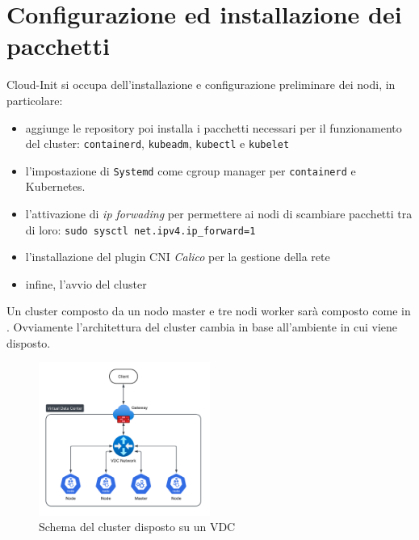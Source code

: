 \documentclass[12pt,a4paper,openright,twoside]{book}
\begin{document}
\section{Configurazione ed installazione dei pacchetti}
Cloud-Init si occupa dell'installazione e configurazione preliminare dei nodi, in particolare:
\begin{itemize}
    \item aggiunge le repository poi installa i pacchetti necessari per il funzionamento del cluster: \texttt{containerd}, \texttt{kubeadm}, \texttt{kubectl} e \texttt{kubelet}
    \item {l'impostazione di \texttt{Systemd} come cgroup manager per \texttt{containerd} e Kubernetes.
        
    }
    \item l'attivazione di \textit{ip forwading} per permettere ai nodi di scambiare pacchetti tra di loro: \verb|sudo sysctl net.ipv4.ip_forward=1|
    \item l'installazione del plugin CNI \textit{Calico} per la gestione della rete
    \item infine, l'avvio del cluster
\end{itemize}
Un cluster composto da un nodo master e tre nodi worker sarà composto come in . Ovviamente l'architettura del cluster cambia in base all'ambiente in cui viene disposto.
\begin{figure}[!hbt]
    \centering
    \includegraphics[width=0.5\textwidth]{figures/kube-vdc.png}
    \caption{Schema del cluster disposto su un VDC}
    \label{fig:kube-cluster}
\end{figure}
\end{document}
